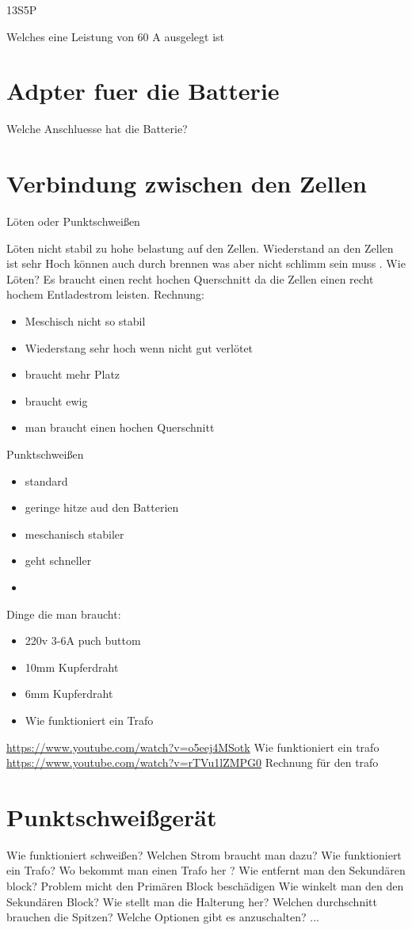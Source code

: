 13S5P 

Welches eine Leistung von 60 A ausgelegt ist 

\section{Adpter fuer die Batterie}
Welche Anschluesse hat die Batterie?


\section{Verbindung zwischen den Zellen}
Löten oder Punktschweißen

Löten nicht stabil zu hohe belastung auf den Zellen. Wiederstand an den Zellen ist sehr Hoch können auch durch brennen was aber nicht schlimm sein muss .
Wie Löten?
Es braucht einen recht hochen Querschnitt da die Zellen einen recht hochem Entladestrom leisten. Rechnung:
\begin{itemize}
    \item Meschisch nicht so stabil
    \item Wiederstang sehr hoch wenn nicht gut verlötet
    \item braucht mehr Platz
    \item braucht ewig
    \item man braucht einen hochen Querschnitt
\end{itemize}

Punktschweißen
\begin{itemize}
    \item standard
    \item geringe hitze aud den Batterien
    \item meschanisch stabiler
    \item geht schneller
    \item 
\end{itemize}
Dinge die man braucht:
\begin{itemize}
    \item 220v 3-6A puch buttom
    \item 10mm Kupferdraht
    \item 6mm Kupferdraht
    \item Wie funktioniert ein Trafo
\end{itemize}
\url{https://www.youtube.com/watch?v=o5eej4MSotk}
Wie funktioniert ein trafo
\url{https://www.youtube.com/watch?v=rTVu1lZMPG0}
Rechnung für den trafo

\section{Punktschweißgerät}
Wie funktioniert schweißen?
Welchen Strom braucht man dazu?
Wie funktioniert ein Trafo?
Wo bekommt man einen Trafo her ?
Wie entfernt man den Sekundären block?
Problem micht den Primären Block beschädigen
Wie winkelt man den den Sekundären Block?
Wie stellt man die Halterung her?
Welchen durchschnitt brauchen die Spitzen?
Welche Optionen gibt es anzuschalten?
...

